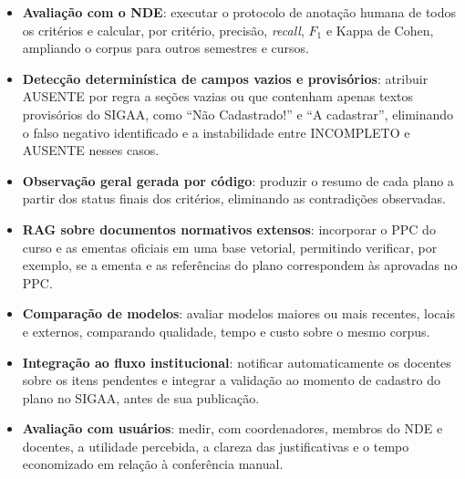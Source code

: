\begin{itemize}
    \item \textbf{Avaliação com o NDE}: executar o protocolo de anotação humana de todos os critérios e calcular, por critério, precisão, \textit{recall}, $F_1$ e Kappa de Cohen, ampliando o corpus para outros semestres e cursos.
    \item \textbf{Detecção determinística de campos vazios e provisórios}: atribuir AUSENTE por regra a seções vazias ou que contenham apenas textos provisórios do SIGAA, como ``Não Cadastrado!'' e ``A cadastrar'', eliminando o falso negativo identificado e a instabilidade entre INCOMPLETO e AUSENTE nesses casos.
    \item \textbf{Observação geral gerada por código}: produzir o resumo de cada plano a partir dos status finais dos critérios, eliminando as contradições observadas.
    \item \textbf{RAG sobre documentos normativos extensos}: incorporar o PPC do curso e as ementas oficiais em uma base vetorial, permitindo verificar, por exemplo, se a ementa e as referências do plano correspondem às aprovadas no PPC.
    \item \textbf{Comparação de modelos}: avaliar modelos maiores ou mais recentes, locais e externos, comparando qualidade, tempo e custo sobre o mesmo corpus.
    \item \textbf{Integração ao fluxo institucional}: notificar automaticamente os docentes sobre os itens pendentes e integrar a validação ao momento de cadastro do plano no SIGAA, antes de sua publicação.
    \item \textbf{Avaliação com usuários}: medir, com coordenadores, membros do NDE e docentes, a utilidade percebida, a clareza das justificativas e o tempo economizado em relação à conferência manual.
\end{itemize}
